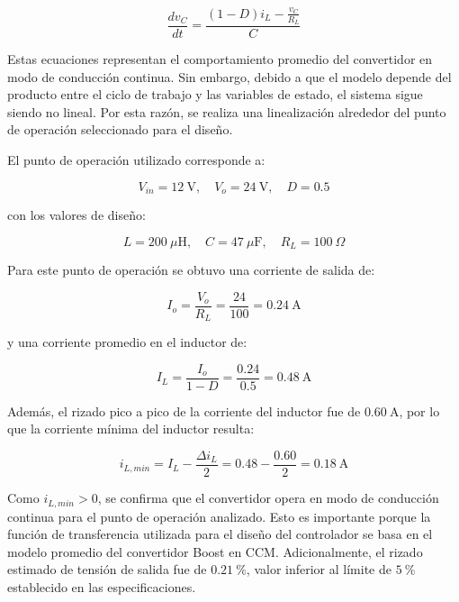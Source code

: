 \documentclass[conference]{IEEEtran}
\begin{document}
\begin{equation}
    \frac{dv_C}{dt} =
    \frac{(1-D)i_L - \frac{v_C}{R_L}}{C}
    \label{eq:boost_prom_vc}
\end{equation}

Estas ecuaciones representan el comportamiento promedio del convertidor en modo de conducción continua. Sin embargo, debido a que el modelo depende del producto entre el ciclo de trabajo y las variables de estado, el sistema sigue siendo no lineal. Por esta razón, se realiza una linealización alrededor del punto de operación seleccionado para el diseño.

El punto de operación utilizado corresponde a:

\begin{equation}
    V_{in}=12~\mathrm{V}, \quad
    V_o=24~\mathrm{V}, \quad
    D=0.5
\end{equation}

con los valores de diseño:

\begin{equation}
    L=200~\mu\mathrm{H}, \quad
    C=47~\mu\mathrm{F}, \quad
    R_L=100~\Omega
\end{equation}

Para este punto de operación se obtuvo una corriente de salida de:

\begin{equation}
    I_o = \frac{V_o}{R_L}
    =
    \frac{24}{100}
    =
    0.24~\mathrm{A}
\end{equation}

y una corriente promedio en el inductor de:

\begin{equation}
    I_L = \frac{I_o}{1-D}
    =
    \frac{0.24}{0.5}
    =
    0.48~\mathrm{A}
\end{equation}

Además, el rizado pico a pico de la corriente del inductor fue de
$0.60~\mathrm{A}$, por lo que la corriente mínima del inductor resulta:

\begin{equation}
    i_{L,min}=I_L-\frac{\Delta i_L}{2}
    =
    0.48-\frac{0.60}{2}
    =
    0.18~\mathrm{A}
\end{equation}

Como $i_{L,min}>0$, se confirma que el convertidor opera en modo de conducción continua para el punto de operación analizado. Esto es importante porque la función de transferencia utilizada para el diseño del controlador se basa en el modelo promedio del convertidor Boost en CCM. Adicionalmente, el rizado estimado de tensión de salida fue de $0.21~\%$, valor inferior al límite de $5~\%$ establecido en las especificaciones.
\end{document}

